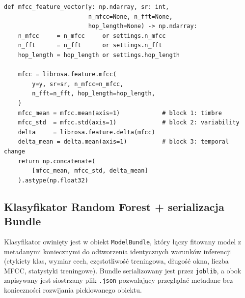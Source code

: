 \documentclass[11pt,a4paper]{article}
\begin{document}
\begin{lstlisting}[caption={MFCC z $\sigma$ i $\Delta$-średnimi
(\texttt{features/audio.py}).},label={lst:mfcc}]
def mfcc_feature_vector(y: np.ndarray, sr: int,
                        n_mfcc=None, n_fft=None,
                        hop_length=None) -> np.ndarray:
    n_mfcc     = n_mfcc     or settings.n_mfcc
    n_fft      = n_fft      or settings.n_fft
    hop_length = hop_length or settings.hop_length

    mfcc = librosa.feature.mfcc(
        y=y, sr=sr, n_mfcc=n_mfcc,
        n_fft=n_fft, hop_length=hop_length,
    )
    mfcc_mean = mfcc.mean(axis=1)            # block 1: timbre
    mfcc_std  = mfcc.std(axis=1)             # block 2: variability
    delta     = librosa.feature.delta(mfcc)
    delta_mean = delta.mean(axis=1)          # block 3: temporal change
    return np.concatenate(
        [mfcc_mean, mfcc_std, delta_mean]
    ).astype(np.float32)
\end{lstlisting}

\subsection{Klasyfikator Random Forest + serializacja Bundle}

Klasyfikator owinięty jest w obiekt \texttt{ModelBundle}, który łączy fitowany
model z metadanymi koniecznymi do odtworzenia identycznych warunków inferencji
(etykiety klas, wymiar cech, częstotliwość treningowa, długość okna, liczba
MFCC, statystyki treningowe). Bundle serializowany jest przez \texttt{joblib},
a obok zapisywany jest siostrzany plik \texttt{.json} pozwalający przeglądać
metadane bez konieczności rozwijania picklowanego obiektu.
\end{document}
